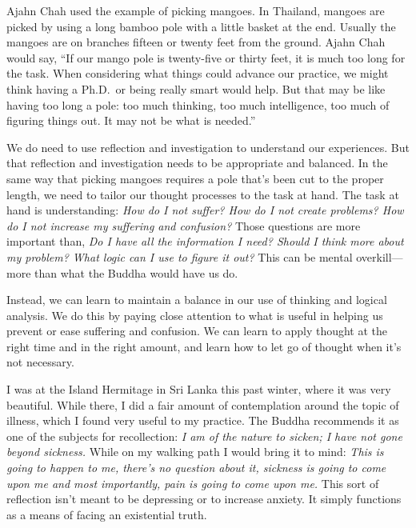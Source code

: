 Ajahn Chah used the example of picking mangoes. In Thailand, mangoes 
are picked by using a long bamboo pole with a little basket at the end. 
Usually the mangoes are on branches fifteen or twenty feet from the 
ground. Ajahn Chah would say, ``If our mango pole is twenty-five or 
thirty feet, it is much too long for the task. When considering what 
things could advance our practice, we might think having a Ph.D. or 
being really smart would help. But that may be like having too long a 
pole: too much thinking, too much intelligence, too much of figuring 
things out. It may not be what is needed.''

We do need to use reflection and investigation to understand our 
experiences. But that reflection and investigation needs to be 
appropriate and balanced. In the same way that picking mangoes requires 
a pole that's been cut to the proper length, we need to tailor our 
thought processes to the task at hand. The task at hand is 
understanding: \emph{How do I not suffer? How do I not create problems? 
How do I not increase my suffering and confusion?} Those questions are 
more important than, \emph{Do I have all the information I need? Should 
I think more about my problem? What logic can I use to figure it out?} 
This can be mental overkill---more than what the Buddha would have us 
do.

Instead, we can learn to maintain a balance in our use of thinking and 
logical analysis. We do this by paying close attention to what is 
useful in helping us prevent or ease suffering and confusion. We can 
learn to apply thought at the right time and in the right amount, and 
learn how to let go of thought when it's not necessary.


I was at the Island Hermitage in Sri Lanka this past winter, where it 
was very beautiful. While there, I did a fair amount of contemplation 
around the topic of illness, which I found very useful to my practice. 
The Buddha recommends it as one of the subjects for recollection: 
\emph{I am of the nature to sicken; I have not gone beyond sickness.} 
While on my walking path I would bring it to mind: \emph{This is going 
to happen to me, there's no question about it, sickness is going to 
come upon me and most importantly, pain is going to come upon me.} This 
sort of reflection isn't meant to be depressing or to increase anxiety. 
It simply functions as a means of facing an existential truth.


